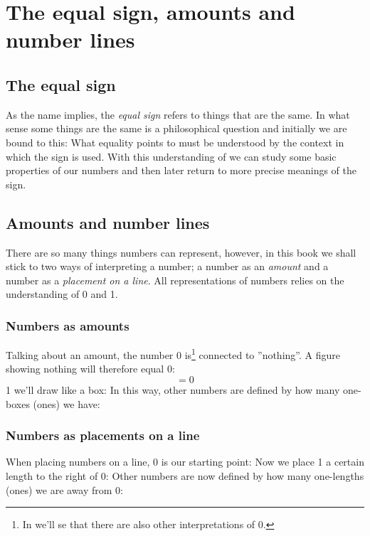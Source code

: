 



\newpage
\section{The equal sign, amounts and number lines}
\subsection*{The equal sign}
As the name implies, the \textit{equal sign}  \sym{$ = $} refers to things that are the same. In what sense some things are the same is a philosophical question and initially we are bound to this: What equality \sym{$=$} points to must be understood by the context in which the sign is used. With this understanding of \sym{=} we can study some basic properties of our numbers and then later return to more precise meanings of the sign. \regv
{}
\subsection*{Amounts and number lines}
There are so many things numbers can represent, however, in this book we shall stick to two ways of interpreting a number; a number as an \textsl{amount} and a number as a \textsl{placement on a line}. All representations of numbers relies on the understanding of 0 and 1.

\subsubsection*{Numbers as amounts}
	Talking about an amount, the number 0 is\footnote{In  we'll se that there are also other interpretations of 0.} connected to ''nothing''. A figure showing nothing will therefore equal 0:
	\[ =0 \]
	1 we'll draw like a box:
In this way, other numbers are defined by how many one-boxes (ones) we have:
\newpage	
\subsubsection*{Numbers as placements on a line}
	When placing numbers on a line, 0 is our starting point:
	Now we place 1 a certain length to the right of 0:
	Other numbers are now defined by how many one-lengths (ones) we are away from 0:
